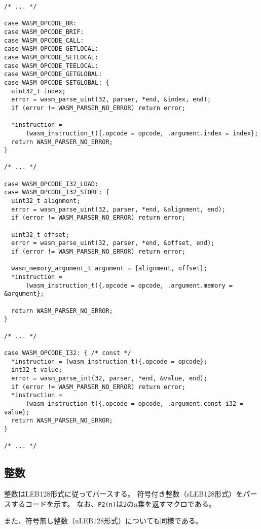 \begin{lstlisting}[caption=命令のパース,label=lst:argument_t]
/* ... */

case WASM_OPCODE_BR:
case WASM_OPCODE_BRIF:
case WASM_OPCODE_CALL:
case WASM_OPCODE_GETLOCAL:
case WASM_OPCODE_SETLOCAL:
case WASM_OPCODE_TEELOCAL:
case WASM_OPCODE_GETGLOBAL:
case WASM_OPCODE_SETGLOBAL: {
  uint32_t index;
  error = wasm_parse_uint(32, parser, *end, &index, end);
  if (error != WASM_PARSER_NO_ERROR) return error;

  *instruction =
      (wasm_instruction_t){.opcode = opcode, .argument.index = index};
  return WASM_PARSER_NO_ERROR;
}

/* ... */

case WASM_OPCODE_I32_LOAD:
case WASM_OPCODE_I32_STORE: {
  uint32_t alignment;
  error = wasm_parse_uint(32, parser, *end, &alignment, end);
  if (error != WASM_PARSER_NO_ERROR) return error;

  uint32_t offset;
  error = wasm_parse_uint(32, parser, *end, &offset, end);
  if (error != WASM_PARSER_NO_ERROR) return error;

  wasm_memory_argument_t argument = {alignment, offset};
  *instruction =
      (wasm_instruction_t){.opcode = opcode, .argument.memory = &argument};

  return WASM_PARSER_NO_ERROR;
}

/* ... */

case WASM_OPCODE_I32: { /* const */
  *instruction = (wasm_instruction_t){.opcode = opcode};
  int32_t value;
  error = wasm_parse_int(32, parser, *end, &value, end);
  if (error != WASM_PARSER_NO_ERROR) return error;
  *instruction =
      (wasm_instruction_t){.opcode = opcode, .argument.const_i32 = value};
  return WASM_PARSER_NO_ERROR;
}

/* ... */
\end{lstlisting}

\subsection{整数}
\label{subsec:parse_sint}

整数はLEB128形式に従ってパースする。
符号付き整数（sLEB128形式）をパースするコードを示す。
なお、{\tt P2(n)}は2のn乗を返すマクロである。

また、符号無し整数（uLEB128形式）についても同様である。

